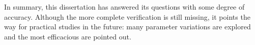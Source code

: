 In summary, this dissertation has answered its questions with some
degree of accuracy. Although the more complete verification is still
missing, it points the way for practical studies in the future: many
parameter variations are explored and the most efficacious are pointed
out.


